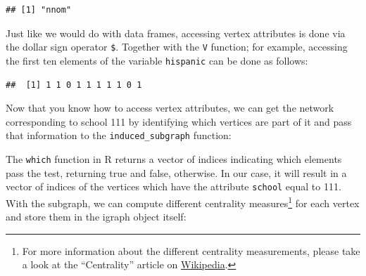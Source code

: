 \documentclass[
]{book}
\newenvironment{Shaded}{\begin{snugshade}}{\end{snugshade}}
\newcommand{\AttributeTok}[1]{\textcolor[rgb]{0.13,0.29,0.53}{#1}}
\newcommand{\CommentTok}[1]{\textcolor[rgb]{0.56,0.35,0.01}{\textit{#1}}}
\newcommand{\DecValTok}[1]{\textcolor[rgb]{0.00,0.00,0.81}{#1}}
\newcommand{\FunctionTok}[1]{\textcolor[rgb]{0.13,0.29,0.53}{\textbf{#1}}}
\newcommand{\NormalTok}[1]{#1}
\newcommand{\OtherTok}[1]{\textcolor[rgb]{0.56,0.35,0.01}{#1}}
\newcommand{\SpecialCharTok}[1]{\textcolor[rgb]{0.81,0.36,0.00}{\textbf{#1}}}
\begin{document}
\begin{verbatim}
## [1] "nnom"
\end{verbatim}

Just like we would do with data frames, accessing vertex attributes is done via the dollar sign operator \texttt{\$}. Together with the \texttt{V} function; for example, accessing the first ten elements of the variable \texttt{hispanic} can be done as follows:

\begin{Shaded}
\end{Shaded}

\begin{verbatim}
##  [1] 1 1 0 1 1 1 1 1 0 1
\end{verbatim}

Now that you know how to access vertex attributes, we can get the network corresponding to school 111 by identifying which vertices are part of it and pass that information to the \texttt{induced\_subgraph} function:

\begin{Shaded}
\end{Shaded}

The \texttt{which} function in R returns a vector of indices indicating which elements pass the test, returning true and false, otherwise. In our case, it will result in a vector of indices of the vertices which have the attribute \texttt{school} equal to 111. With the subgraph, we can compute different centrality measures\footnote{For more information about the different centrality measurements, please take a look at the ``Centrality'' article on \href{https://en.wikipedia.org/wiki/Centrality}{Wikipedia}.} for each vertex and store them in the igraph object itself:
\end{document}
